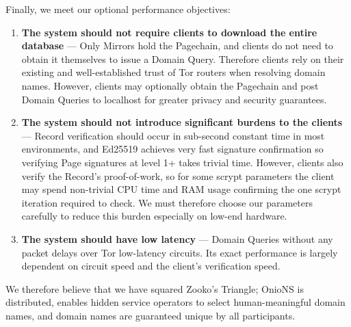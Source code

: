 Finally, we meet our optional performance objectives:

\begin{enumerate}
	\item \textbf{The system should not require clients to download the entire database} --- Only Mirrors hold the Pagechain, and clients do not need to obtain it themselves to issue a Domain Query. Therefore clients rely on their existing and well-established trust of Tor routers when resolving domain names. However, clients may optionally obtain the Pagechain and post Domain Queries to localhost for greater privacy and security guarantees.
	\item \textbf{The system should not introduce significant burdens to the clients} --- Record verification should occur in sub-second constant time in most environments, and Ed25519 achieves very fast signature confirmation so verifying Page signatures at level 1+ takes trivial time. However, clients also verify the Record's proof-of-work, so for some scrypt parameters the client may spend non-trivial CPU time and RAM usage confirming the one scrypt iteration required to check. We must therefore choose our parameters carefully to reduce this burden especially on low-end hardware.
	\item \textbf{The system should have low latency} --- Domain Queries without any packet delays over Tor low-latency circuits. Its exact performance is largely dependent on circuit speed and the client's verification speed.
\end{enumerate}

We therefore believe that we have squared Zooko's Triangle; OnioNS is distributed, enables hidden service operators to select human-meaningful domain names, and domain names are guaranteed unique by all participants.
